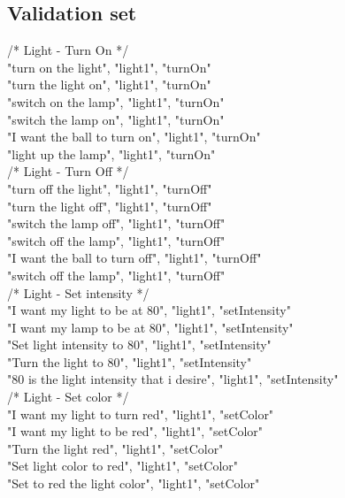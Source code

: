 \documentclass[twoside]{supsistudent}
\begin{document}
\begin{appendices}
\chapter{Validation set}
	/*
        Light - Turn On
         */\\
	"turn on the light", "light1", "turnOn"\\
        "turn the light on", "light1", "turnOn"\\
        "switch on the lamp", "light1", "turnOn"\\
        "switch the lamp on", "light1", "turnOn"\\
        "I want the ball to turn on", "light1", "turnOn"\\
        "light up the lamp", "light1", "turnOn"\\
         /*
        Light - Turn Off
         */\\
        "turn off the light", "light1", "turnOff"\\
        "turn the light off", "light1", "turnOff"\\
        "switch the lamp off", "light1", "turnOff"\\
        "switch off the lamp", "light1", "turnOff"\\
        "I want the ball to turn off", "light1", "turnOff"\\
        "switch off the lamp", "light1", "turnOff"\\
         /*
        Light - Set intensity
         */\\
        "I want my light to be at 80", "light1", "setIntensity"\\
        "I want my lamp to be at 80", "light1", "setIntensity"\\
        "Set light intensity to 80", "light1", "setIntensity"\\
        "Turn the light to 80", "light1", "setIntensity"\\
        "80 is the light intensity that i desire", "light1", "setIntensity"\\
        /*
        Light - Set color
         */\\
        "I want my light to turn red", "light1", "setColor"\\
        "I want my light to be red", "light1", "setColor"\\
        "Turn the light red", "light1", "setColor"\\
        "Set light color to red", "light1", "setColor"\\
        "Set to red the light color", "light1", "setColor"\\

\end{appendices}
\end{document}
